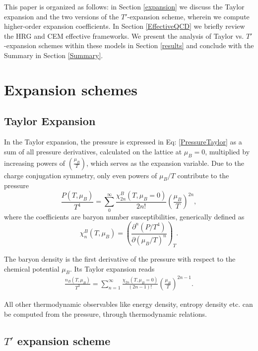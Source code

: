 \documentclass[%
 reprint,
nofootinbib,
 amsmath,amssymb,
 aps,
prc
]{revtex4-2}
\begin{document}
This paper is organized as follows: in Section \ref{expansion}  we discuss the Taylor expansion and the two versions of the $T'$-expansion scheme, wherein we compute higher-order expansion coefficients. In Section \ref{EffectiveQCD} we briefly review the HRG and CEM effective frameworks.
We present the analysis of Taylor vs. $T'$-expansion schemes within these models in Section \ref{results} and conclude with the Summary in Section \ref{Summary}.

\section{\label{expansion}Expansion schemes}
\subsection{\label{expansionT}Taylor Expansion}

In the Taylor expansion, the pressure is expressed in Eq: \eqref{PressureTaylor} as a sum of all pressure derivatives, calculated on the lattice at $\mu_B=0$, multiplied by increasing powers of $\left(\frac{\mu_B}{T}\right)$, which serves as the expansion variable. 
Due to the charge conjugation symmetry, only even powers of $\mu_B/T$ contribute to the pressure
\begin{equation}
    \frac{P(T,\mu_B)}{T^4} = \sum_0^\infty
    \frac{\chi_{2n}^B(T,\mu_B = 0)}{2n!}
    \left(\frac{\mu_B}{T}\right)^{2n}, 
    \label{PressureTaylor}
\end{equation}
where the coefficients are baryon number susceptibilities, generically defined as
\begin{equation*}
    \chi_n^B(T,\mu_B) = 
    \left( \frac{\partial^n (P/T^4)}{\partial (\mu_B/T)^n} \right)_T.
\end{equation*} 

The baryon density is the first derivative of the pressure with respect to the chemical potential $\mu_B$. Its Taylor expansion reads
\begin{eqnarray}
    \frac{n_B(T,\mu_B)}{T^3} 
    =\sum_{n=1}^\infty 
    \frac{\chi_{2n}(T,\mu_B=0)}{(2n-1)!}
    \left(\frac{\mu_B}{T}\right)^{2n-1}.
    \label{BaryonTaylor}
\end{eqnarray}

All other thermodynamic observables like energy density, entropy density etc. can be computed from the pressure, through thermodynamic relations.

\subsection{\label{sec:citeref}$T'$ expansion scheme}
\end{document}
